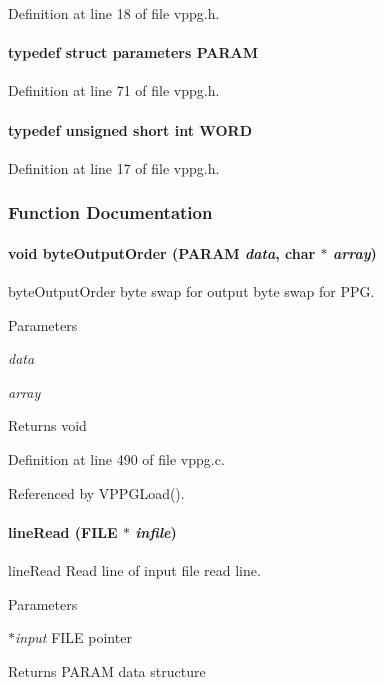 Definition at line 18 of file vppg.h.
\paragraph[{PARAM}]{\setlength{\rightskip}{0pt plus 5cm}typedef struct {\bf parameters} {\bf PARAM}}\hfill\label{vppg_8h_a2527b8e66b1d012d8253e12256150b18}


Definition at line 71 of file vppg.h.
\paragraph[{WORD}]{\setlength{\rightskip}{0pt plus 5cm}typedef unsigned short int {\bf WORD}}\hfill\label{vppg_8h_a2b0e863dadf920709ec53d9088ee7c91}


Definition at line 17 of file vppg.h.

\subsubsection{Function Documentation}
\paragraph[{byteOutputOrder}]{\setlength{\rightskip}{0pt plus 5cm}void byteOutputOrder ({\bf PARAM} {\em data}, \/  char $\ast$ {\em array})}\hfill\label{vppg_8h_a75ca53aa4c6983bef5186a0138854857}
byteOutputOrder byte swap for output  byte swap for PPG. 
\begin{DoxyParams}{Parameters}
\item[{\em data}]\item[{\em array}]\end{DoxyParams}
\begin{DoxyReturn}{Returns}
void 
\end{DoxyReturn}


Definition at line 490 of file vppg.c.

Referenced by VPPGLoad().
\paragraph[{lineRead}]{ lineRead (FILE $\ast$ {\em infile})}\hfill\label{vppg_8h_a65d359ba2af747d08164cc1180b3f1de}
lineRead Read line of input file  read line. 
\begin{DoxyParams}{Parameters}
\item[{\em $\ast$input}]FILE pointer \end{DoxyParams}
\begin{DoxyReturn}{Returns}
PARAM data structure 
\end{DoxyReturn}


